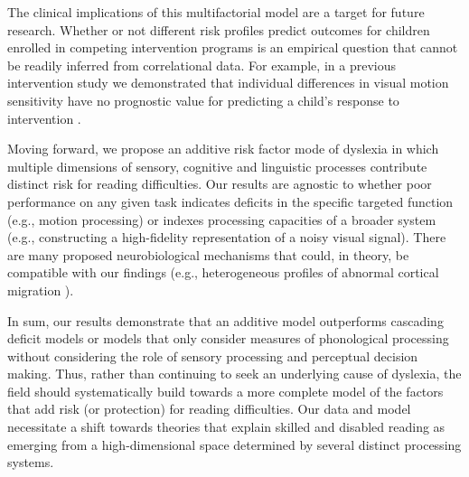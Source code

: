 \documentclass[../uwthesis.tex]{subfiles}
\begin{document}
The clinical implications of this multifactorial model are a target for future research. Whether or not different risk profiles predict outcomes for children enrolled in competing intervention programs is an empirical question that cannot be readily inferred from correlational data. For example, in a previous intervention study we demonstrated that individual differences in visual motion sensitivity have no prognostic value for predicting a child’s response to intervention \cite{Joo2017a}.

Moving forward, we propose an additive risk factor mode of dyslexia in which multiple dimensions of sensory, cognitive and linguistic processes contribute distinct risk for reading difficulties.  Our results are agnostic to whether poor performance on any given task indicates deficits in the specific targeted function (e.g., motion processing) or indexes processing capacities of a broader system (e.g., constructing a high-fidelity representation of a noisy visual signal). There are many proposed neurobiological mechanisms that could, in theory, be compatible with our findings (e.g., heterogeneous profiles of abnormal cortical migration \cite{Hancock2017NeuralDyslexia}). 

In sum, our results demonstrate that an additive model outperforms cascading deficit models or models that only consider measures of phonological processing without considering the role of sensory processing and perceptual decision making. Thus, rather than continuing to seek an underlying cause of dyslexia, the field should systematically build towards a more complete model of the factors that add risk (or protection) for reading difficulties. Our data and model necessitate a shift towards theories that explain skilled and disabled reading as emerging from a high-dimensional space determined by several distinct processing systems. 
\end{document}
